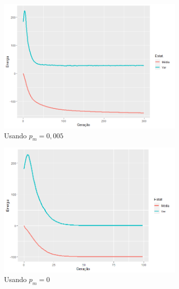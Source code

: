 \begin{figure}[ht]
	\centering
	\begin{subfigure}[b]{0.47\linewidth}
		\includegraphics[width=\linewidth]{imagens/curva_media_var_1.png}
		\caption{Usando \(p_m = 0,005\)}
	\end{subfigure}
	\begin{subfigure}[b]{0.47\linewidth}
		\includegraphics[width=\linewidth]{imagens/curva_media_var_2.png}
		\caption{Usando \(p_m = 0\)}
	\end{subfigure}
	\begin{subfigure}[b]{0.67\linewidth}

\end{subfigure}
\end{figure}
